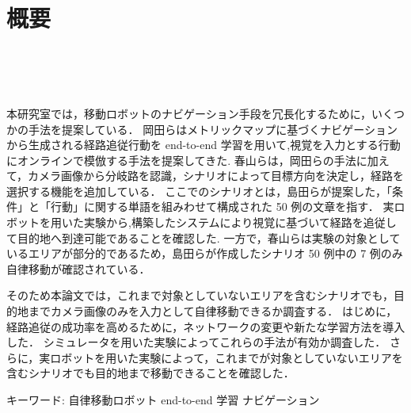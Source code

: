 \chapter*{概要}
\thispagestyle{empty}
%
\begin{center}
  \scalebox{1.0}{視覚と行動のend-to-end学習により}\\
  \vspace{-1.0zh}
  \scalebox{1.0}{経路追従行動を模倣する手法の提案}\\
  \scalebox{1.0}{-経路選択の成功率向上を意図したネットワークの変更と実験的評価-}\\
\end{center}
\vspace{1.0zh}

本研究室では，移動ロボットのナビゲーション手段を冗長化するために，いくつかの手法を提案している．
岡田らはメトリックマップに基づくナビゲーションから生成される経路追従行動を end-to-end 学習を用いて,視覚を入力とする行動にオンラインで模倣する手法を提案してきた.
春山らは，岡田らの手法に加えて，カメラ画像から分岐路を認識，シナリオによって目標方向を決定し，経路を選択する機能を追加している．
ここでのシナリオとは，島田らが提案した，「条件」と「行動」に関する単語を組みわせて構成された 50 例の文章を指す．
実ロボットを用いた実験から,構築したシステムにより視覚に基づいて経路を追従して目的地へ到達可能であることを確認した.
一方で，春山らは実験の対象としているエリアが部分的であるため，島田らが作成したシナリオ 50 例中の 7 例のみ自律移動が確認されている．

そのため本論文では，これまで対象としていないエリアを含むシナリオでも，目的地までカメラ画像のみを入力として自律移動できるか調査する．
はじめに，経路追従の成功率を高めるために，ネットワークの変更や新たな学習方法を導入した．
シミュレータを用いた実験によってこれらの手法が有効か調査した．
さらに，実ロボットを用いた実験によって，これまでが対象としていないエリアを含むシナリオでも目的地まで移動できることを確認した．

キーワード: 自律移動ロボット end-to-end 学習 ナビゲーション
%
\newpage
